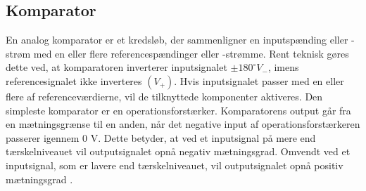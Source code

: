 \subsection{Komparator}\label{Komparatorafsnit}
En analog komparator er et kredsløb, der sammenligner en inputspænding eller -strøm med en eller flere referencespændinger eller -strømme. Rent teknisk gøres dette ved, at komparatoren inverterer inputsignalet $\pm 180^{\circ} V_{-}$, imens referencesignalet ikke inverteres $(V_{+})$. Hvis inputsignalet passer med en eller flere af referenceværdierne, vil de tilknyttede komponenter aktiveres. Den simpleste komparator er en operationsforstærker.  
Komparatorens output går fra en mætningsgrænse til en anden, når det negative input af operationsforstærkeren passerer igennem 0 V. Dette betyder, at ved et inputsignal på mere end tærskelniveauet vil outputsignalet opnå negativ mætningsgrad. Omvendt ved et inputsignal, som er lavere end tærskelniveauet, vil outputsignalet opnå positiv mætningsgrad . \cite{webster2009} 

